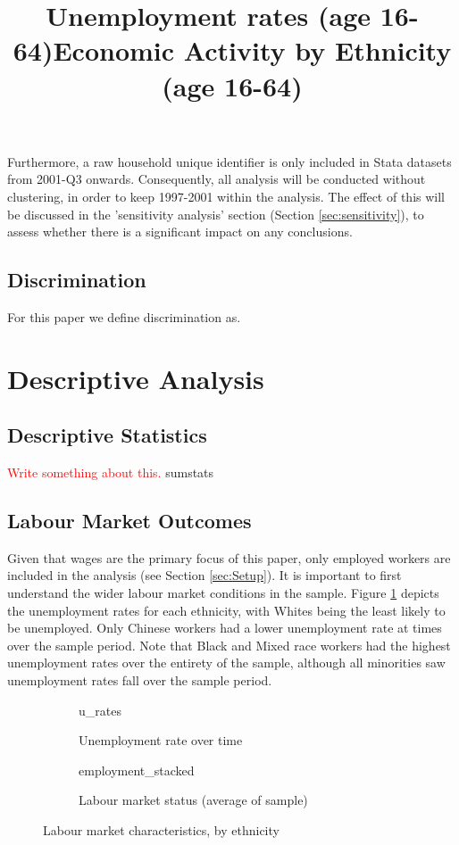 \documentclass[class=article, crop=false]{standalone}
\begin{document}
Furthermore, a raw household unique identifier is only included in Stata datasets from 2001-Q3 onwards. Consequently, all analysis will be conducted without clustering, in order to keep 1997-2001 within the analysis. The effect of this will be discussed in the 'sensitivity analysis' section (Section \ref{sec:sensitivity}), to assess whether there is a significant impact on any conclusions.

\subsection{Discrimination}
\label{sec:Discrimination}
For this paper we define discrimination as.


\section{Descriptive Analysis}
\label{sec:Descriptive Analysis}
\subsection{Descriptive Statistics}
\label{sec:Descriptive Statistics}
\textcolor{red}{Write something about this.}
{sumstats}

\subsection{Labour Market Outcomes}
\label{sec:Labour Market Outcomes}
Given that wages are the primary focus of this paper, only employed workers are included in the analysis (see Section \ref{sec:Setup}). It is important to first understand the wider labour market conditions in the sample. Figure \ref{fig:u_rates} depicts the unemployment rates for each ethnicity, with Whites being the least likely to be unemployed. Only Chinese workers had a lower unemployment rate at times over the sample period. Note that Black and Mixed race workers had the highest unemployment rates over the entirety of the sample, although all minorities saw unemployment rates fall over the sample period.
\begin{figure}
\begin{subfigure}{0.5\textwidth}
\centering
    \title{Unemployment rates (age 16-64)}
    {u_rates}
    \caption{Unemployment rate over time}
    \label{fig:u_rates}
\end{subfigure}
\begin{subfigure}{0.5\textwidth}
\centering
    \title{Economic Activity by Ethnicity (age 16-64)}
    {employment_stacked}
    \caption{Labour market status (average of sample)}
    \label{fig:employment_stacked}
\end{subfigure}
\caption{Labour market characteristics, by ethnicity}
\label{fig:labour_market}
\end{figure}
\end{document}
